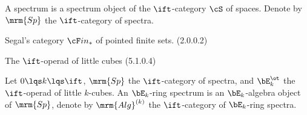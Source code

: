 \documentclass[article, a4paper, twoside]{universal}
\begin{document}
\begin{dfn}[1.4.3.1]
    A spectrum is a spectrum object of the $\ift$-category $\cS$ of spaces. Denote by $\mrm{Sp}$ the $\ift$-category of spectra.
\end{dfn}



Segal's category $\cF in_{*}$ of pointed finite sets. (2.0.0.2)

The $\ift$-operad of little cubes (5.1.0.4)



\begin{dfn}[7.1.0.1]
    Let $0\lqs k\lqs \ift$, $\mrm{Sp}$ the $\ift$-category of spectra, and $\bE_{k}^{\ot}$ the $\ift$-operad of little $k$-cubes. An $\bE_{k}$-ring spectrum is an $\bE_{k}$-algebra object of $\mrm{Sp}$, denote by $\mrm{Alg}^{(k)}$ the $\ift$-category of $\bE_{k}$-ring spectra.
\end{dfn}



\printref
\end{document}
